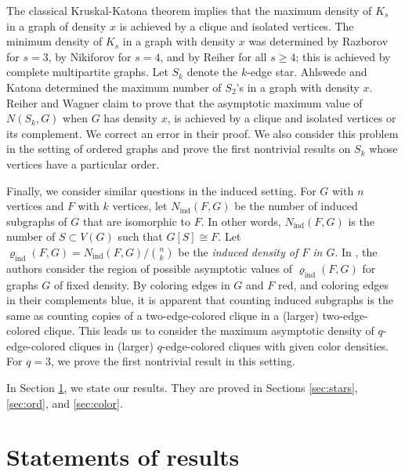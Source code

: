 \documentclass[11pt]{article}
\newcommand{\ind}{{\operatorname{ind}}}
\theoremstyle{definition}
\begin{document}
The classical Kruskal-Katona theorem \cite{13, 14} implies that the maximum density of $K_s$ in a graph of  density $x$ is achieved by a clique and isolated vertices. The minimum density of $K_s$  in a graph with density $x$ was determined by Razborov \cite{Raz} for $s=3$, by  Nikiforov \cite{N} for $s=4$, and  by Reiher \cite{R} for all $s \ge 4$; this is achieved by complete multipartite graphs.  Let $S_k$ denote the $k$-edge star. Ahlswede and Katona \cite{AK} determined the maximum number of $S_2$'s in a graph with density $x$. Reiher and Wagner \cite{RW} claim to prove that the asymptotic maximum value of $N(S_k, G)$ when $G$ has density $x$, is achieved by a clique and isolated vertices or its complement. We correct an error in their proof.  We also consider this problem in the setting of ordered graphs and prove the first nontrivial results on $S_k$ whose vertices have a  particular order.

Finally, we consider similar questions in the induced setting. For $G$ with $n$ vertices and $F$ with $k$ vertices, let $N_\ind (F, G)$ be the number of induced subgraphs of $G$ that are isomorphic to $F$. In other words, $N_\ind (F, G)$ is the number of $S\subset V(G)$ such that $G[S]\cong F$. Let $ \varrho_\ind (F,G) = N_\ind (F, G) / \binom{n}{k} $ be the {\em induced density of $F$ in $G$}. 
In \cite{LMR}, the authors consider the region of possible asymptotic values of $\varrho_\ind (F,G)$ for graphs $G$ of fixed density.  By coloring edges in $G$ and $F$ red, and coloring edges in their complements  blue,  it is apparent that counting induced subgraphs is the same as counting copies of a  two-edge-colored clique in a (larger) two-edge-colored clique. This leads us to consider the maximum asymptotic density of $q$-edge-colored cliques in (larger) $q$-edge-colored cliques with given color densities. For $q = 3$, we prove the first nontrivial result in this setting.

In Section \ref{sec:main}, we  state our results. They are proved in Sections \ref{sec:stars}, \ref{sec:ord}, and \ref{sec:color}. 

\section{Statements of results}\label{sec:main}
\end{document}
